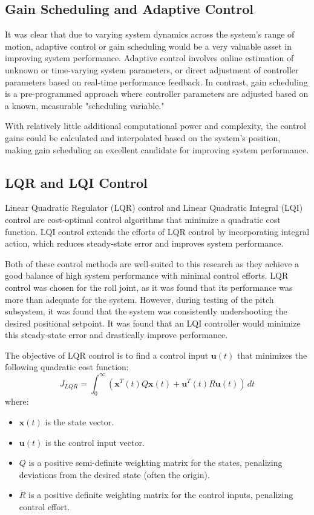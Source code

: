 \subsection{Gain Scheduling and Adaptive Control}

It was clear that due to varying system dynamics across the system's range of motion, adaptive control or gain scheduling would be a very valuable asset in improving system performance. Adaptive control involves online estimation of unknown or time-varying system parameters, or direct adjustment of controller parameters based on real-time performance feedback. In contrast, gain scheduling is a pre-programmed approach where controller parameters are adjusted based on a known, measurable "scheduling variable."

With relatively little additional computational power and complexity, the control gains could be calculated and interpolated based on the system's position, making gain scheduling an excellent candidate for improving system performance.



\subsection{LQR and LQI Control}

Linear Quadratic Regulator (LQR) control and Linear Quadratic Integral (LQI) control are cost-optimal control algorithms that minimize a quadratic cost function. LQI control extends the efforts of LQR control by incorporating integral action, which reduces steady-state error and improves system performance.

Both of these control methods are well-suited to this research as they achieve a good balance of high system performance with minimal control efforts. LQR control was chosen for the roll joint, as it was found that its performance was more than adequate for the system. However, during testing of the pitch subsystem, it was found that the system was consistently undershooting the desired positional setpoint. It was found that an LQI controller would minimize this steady-state error and drastically improve performance.

The objective of LQR control is to find a control input $\mathbf{u}(t)$ that minimizes the following quadratic cost function:
$$ J_{LQR} = \int_{0}^{\infty} (\mathbf{x}^T(t) Q \mathbf{x}(t) + \mathbf{u}^T(t) R \mathbf{u}(t)) \, dt $$
where:
\begin{itemize}
    \item $\mathbf{x}(t)$ is the state vector.
    \item $\mathbf{u}(t)$ is the control input vector.
    \item $Q$ is a positive semi-definite weighting matrix for the states, penalizing deviations from the desired state (often the origin).
    \item $R$ is a positive definite weighting matrix for the control inputs, penalizing control effort.
\end{itemize}

